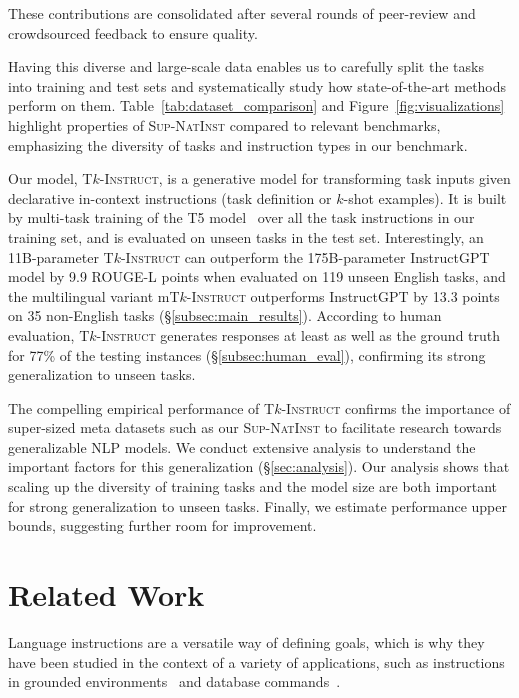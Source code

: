 These contributions are consolidated after several rounds of peer-review and crowdsourced feedback to ensure quality.

Having this diverse and large-scale data enables us to carefully split the tasks into training and test sets and systematically study how state-of-the-art methods perform on them.  Table~\ref{tab:dataset_comparison} and Figure~\ref{fig:visualizations} highlight properties of \textsc{Sup-NatInst} compared to relevant benchmarks, emphasizing the diversity of tasks and instruction types in our benchmark.

Our model, \textsc{T$k$-Instruct}, is a generative model for transforming task inputs given declarative in-context instructions (task definition or $k$-shot examples). It is built by multi-task training of the T5 model~\cite{raffel2020exploring} over all the task instructions in our training set, and is evaluated on unseen tasks in the test set.  Interestingly, an 11B-parameter \textsc{T$k$-Instruct} can outperform the 175B-parameter InstructGPT model by 9.9 ROUGE-L points when evaluated on 119 unseen English tasks, and the multilingual variant m\textsc{T$k$-Instruct} outperforms InstructGPT by 13.3 points on 35 non-English tasks (\S\ref{subsec:main_results}).
According to human evaluation, \textsc{T$k$-Instruct} generates responses at least as well as the ground truth for 77\% of the testing instances (\S\ref{subsec:human_eval}), confirming its strong generalization to unseen tasks. 

The compelling empirical performance of \textsc{T$k$-Instruct} confirms the importance of super-sized meta datasets such as our \textsc{Sup-NatInst} to facilitate research towards generalizable NLP models. We conduct extensive analysis to understand the important factors for this generalization (\S\ref{sec:analysis}). Our analysis shows that scaling up the diversity of training tasks and the model size are both important for strong generalization to unseen tasks. Finally, we estimate performance upper bounds, suggesting further room for improvement.

\section{Related Work}
\label{sec:related:work}

Language instructions are a versatile way of defining goals, which is why they have been studied in the context of a variety of applications, such as instructions in grounded environments~\cite{shridhar2020alfred, stepputtis2020language,min2022film,weir2022one} and database commands~\cite{kim2020natural}.  

